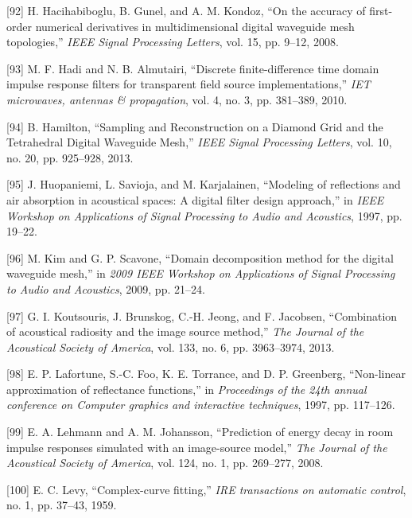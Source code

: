 \documentclass[]{scrreprt}
\begin{document}
\hypertarget{ref-hacihabibogluux5faccuracyux5f2008}{}
{[}92{]} H. Hacihabiboglu, B. Gunel, and A. M. Kondoz, ``On the accuracy
of first-order numerical derivatives in multidimensional digital
waveguide mesh topologies,'' \emph{IEEE Signal Processing Letters}, vol.
15, pp. 9--12, 2008.

\hypertarget{ref-hadiux5fdiscreteux5f2010}{}
{[}93{]} M. F. Hadi and N. B. Almutairi, ``Discrete finite-difference
time domain impulse response filters for transparent field source
implementations,'' \emph{IET microwaves, antennas \& propagation}, vol.
4, no. 3, pp. 381--389, 2010.

\hypertarget{ref-hamiltonux5fsamplingux5f2013}{}
{[}94{]} B. Hamilton, ``Sampling and Reconstruction on a Diamond Grid
and the Tetrahedral Digital Waveguide Mesh,'' \emph{IEEE Signal
Processing Letters}, vol. 10, no. 20, pp. 925--928, 2013.

\hypertarget{ref-huopaniemiux5fmodelingux5f1997}{}
{[}95{]} J. Huopaniemi, L. Savioja, and M. Karjalainen, ``Modeling of
reflections and air absorption in acoustical spaces: A digital filter
design approach,'' in \emph{IEEE Workshop on Applications of Signal
Processing to Audio and Acoustics}, 1997, pp. 19--22.

\hypertarget{ref-kimux5fdomainux5f2009}{}
{[}96{]} M. Kim and G. P. Scavone, ``Domain decomposition method for the
digital waveguide mesh,'' in \emph{2009 IEEE Workshop on Applications of
Signal Processing to Audio and Acoustics}, 2009, pp. 21--24.

\hypertarget{ref-koutsourisux5fcombinationux5f2013}{}
{[}97{]} G. I. Koutsouris, J. Brunskog, C.-H. Jeong, and F. Jacobsen,
``Combination of acoustical radiosity and the image source method,''
\emph{The Journal of the Acoustical Society of America}, vol. 133, no.
6, pp. 3963--3974, 2013.

\hypertarget{ref-lafortuneux5fnon-linearux5f1997}{}
{[}98{]} E. P. Lafortune, S.-C. Foo, K. E. Torrance, and D. P.
Greenberg, ``Non-linear approximation of reflectance functions,'' in
\emph{Proceedings of the 24th annual conference on Computer graphics and
interactive techniques}, 1997, pp. 117--126.

\hypertarget{ref-lehmannux5fpredictionux5f2008}{}
{[}99{]} E. A. Lehmann and A. M. Johansson, ``Prediction of energy decay
in room impulse responses simulated with an image-source model,''
\emph{The Journal of the Acoustical Society of America}, vol. 124, no.
1, pp. 269--277, 2008.

\hypertarget{ref-levyux5fcomplex-curveux5f1959}{}
{[}100{]} E. C. Levy, ``Complex-curve fitting,'' \emph{IRE transactions
on automatic control}, no. 1, pp. 37--43, 1959.
\end{document}
